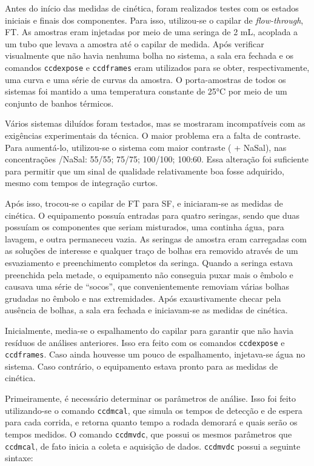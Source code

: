 			Antes do início das medidas de cinética, foram realizados testes com os estados iniciais e finais dos componentes. Para isso, utilizou-se o capilar de \emph{flow-through}, FT. As amostras eram injetadas por meio de uma seringa de 2 mL, acoplada a um tubo que levava a amostra até o capilar de medida. Após verificar visualmente que não havia nenhuma bolha no sistema, a sala era fechada e os comandos \texttt{ccdexpose} e \texttt{ccdframes} eram utilizados para se obter, respectivamente, uma curva e uma série de curvas da amostra. O porta-amostras de todos os sistemas foi mantido a uma temperatura constante de 25°C por meio de um conjunto de banhos térmicos.
			
			Vários sistemas diluídos foram testados, mas se mostraram incompatíveis com as exigências experimentais da técnica. O maior problema era a falta de contraste. Para aumentá-lo, utilizou-se o sistema com maior contraste (\TTAB{} + NaSal), nas concentrações \TTAB/NaSal: 55/55; 75/75; 100/100; 100:60. Essa alteração foi suficiente para permitir que um sinal de qualidade relativamente boa fosse adquirido, mesmo com tempos de integração curtos.
			
			Após isso, trocou-se o capilar de FT para SF, e iniciaram-se as medidas de cinética. O equipamento possuía entradas para quatro seringas, sendo que duas possuíam os componentes que seriam misturados, uma continha água, para lavagem, e outra permaneceu vazia. As seringas de amostra eram carregadas com as soluções de interesse e qualquer traço de bolhas era removido através de um esvaziamento e preenchimento completos da seringa. Quando a seringa estava preenchida pela metade, o equipamento não conseguia puxar mais o êmbolo e causava uma série de ``socos'', que convenientemente removiam várias bolhas grudadas no êmbolo e nas extremidades. Após exaustivamente checar pela ausência de bolhas, a sala era fechada e iniciavam-se as medidas de cinética. 
			
			Inicialmente, media-se o espalhamento do capilar para garantir que não havia resíduos de análises anteriores. Isso era feito com os comandos \texttt{ccdexpose} e \texttt{ccdframes}. Caso ainda houvesse um pouco de espalhamento, injetava-se água no sistema. Caso contrário, o equipamento estava pronto para as medidas de cinética.
			
			Primeiramente, é necessário determinar os parâmetros de análise. Isso foi feito utilizando-se o comando \texttt{ccdmcal}, que simula os tempos de detecção e de espera para cada corrida, e retorna quanto tempo a rodada demorará e quais serão os tempos medidos. O comando \texttt{ccdmvdc}, que possui os mesmos parâmetros que \texttt{ccdmcal}, de fato inicia a coleta e aquisição de dados. \texttt{ccdmvdc} possui a seguinte sintaxe:
			
